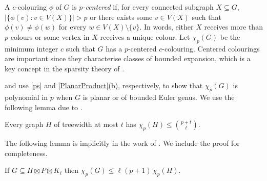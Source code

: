 \documentclass{patmorin}
\renewcommand{\le}{\leqslant}
\renewcommand{\leq}{\leqslant}
\begin{document}
A $c$-colouring $\phi$ of $G$ is \emph{$p$-centered} if, for every connected subgraph $X\subseteq G$, $|\{\phi(v):v\in V(X)\}| > p$ or there exists some $v\in V(X)$ such that $\phi(v)\neq \phi(w)$ for every $w\in V(X)\setminus\{v\}$.  In words, either $X$ receives more than $p$ colours or some vertex in $X$ receives a unique colour.  Let $\chi_p(G)$ be the minimum integer $c$ such that $G$ has a $p$-centered $c$-colouring. Centered colourings are important since they characterise classes of bounded expansion, which is a key concept in the sparsity theory of \citet{Sparsity}.

\citet{pilipczuk.siebertz:polynomial-soda} and \citet{debski.felsner.ea:improved} use \cref{ps} and \cref{PlanarProduct}(b), respectively, to show that $\chi_p(G)$ is polynomial in $p$ when $G$ is planar or of bounded Euler genus.  We use the following lemma due to \citet[Lemma~15]{pilipczuk.siebertz:polynomial-arxiv}.

\begin{lem}
\label{p-centered-treewidth}
  Every graph $H$ of treewidth at most $t$ has $\chi_p(H)\leq \binom{p+t}{t}$.
\end{lem}

The following lemma is implicitly in the work of \citet[Proof of Theorem~2.1]{debski.felsner.ea:improved}. We include the proof for completeness.

\begin{lem}
\label{p-centered}
If $G\subseteq H\boxtimes P \boxtimes K_\ell$ then $\chi_p(G)\le \ell (p+1)\, \chi_p(H)$.
\end{lem}
\end{document}
